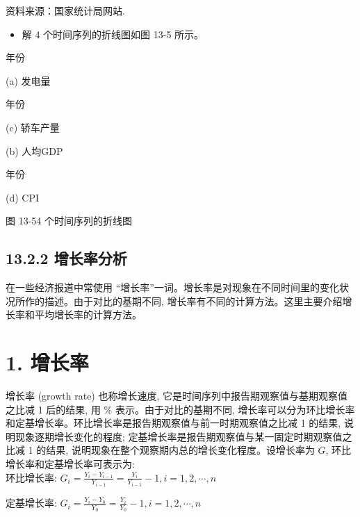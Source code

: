 \documentclass[10pt]{article}
\begin{document}
\begin{CJK*}{UTF8}{bsmi}
资料来源：国家统计局网站.

\begin{itemize}
  \item 解 4 个时间序列的折线图如图 13-5 所示。
\end{itemize}

\begin{center}
\end{center}

年份

(a) 发电量

\begin{center}
\end{center}

年份

(c) 轿车产量

\begin{center}
\end{center}

(b) 人均GDP

\begin{center}
\end{center}

年份

(d) CPI

图 13-54 个时间序列的折线图

\subsection*{13.2.2 增长率分析}
在一些经济报道中常使用 “增长率”一词。增长率是对现象在不同时间里的变化状况所作的描述。由于对比的基期不同, 增长率有不同的计算方法。这里主要介绍增长率和平均增长率的计算方法。

\section*{1. 增长率}
增长率 (growth rate) 也称增长速度, 它是时间序列中报告期观察值与基期观察值之比减 1 后的结果, 用 $\%$ 表示。由于对比的基期不同, 增长率可以分为环比增长率和定基增长率。环比增长率是报告期观察值与前一时期观察值之比减 1 的结果, 说明现象逐期增长变化的程度; 定基增长率是报告期观察值与某一固定时期观察值之比减 1 的结果, 说明现象在整个观察期内总的增长变化程度。设增长率为 $G$, 环比增长率和定基增长率可表示为:\\
环比增长率: $G_{i}=\frac{Y_{i}-Y_{i-1}}{Y_{i-1}}=\frac{Y_{i}}{Y_{i-1}}-1, i=1,2, \cdots, n$

定基增长率: $G_{i}=\frac{Y_{i}-Y_{0}}{Y_{0}}=\frac{Y_{i}}{Y_{0}}-1, i=1,2, \cdots, n$


\end{CJK*}
\end{document}
